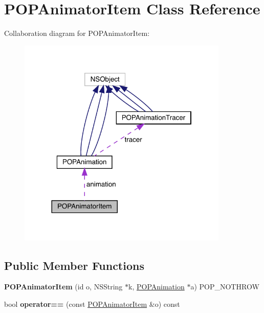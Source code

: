 \hypertarget{class_p_o_p_animator_item}{}\section{P\+O\+P\+Animator\+Item Class Reference}
\label{class_p_o_p_animator_item}


Collaboration diagram for P\+O\+P\+Animator\+Item\+:\nopagebreak
\begin{figure}[H]
\begin{center}
\leavevmode
\includegraphics[width=284pt]{class_p_o_p_animator_item__coll__graph}
\end{center}
\end{figure}
\subsection*{Public Member Functions}
\begin{DoxyCompactItemize}
\item 
\mbox{\label{class_p_o_p_animator_item_a281ab72f000b2cbeb49fe273b7eb37b8}} 
{\bfseries P\+O\+P\+Animator\+Item} (id o, N\+S\+String $\ast$k, \mbox{\hyperlink{interface_p_o_p_animation}{P\+O\+P\+Animation}} $\ast$a) P\+O\+P\+\_\+\+N\+O\+T\+H\+R\+OW
\item 
\mbox{\label{class_p_o_p_animator_item_a37ae740fd429d142dc24b3c249d8cdcc}} 
bool {\bfseries operator==} (const \mbox{\hyperlink{class_p_o_p_animator_item}{P\+O\+P\+Animator\+Item}} \&o) const
\end{DoxyCompactItemize}
